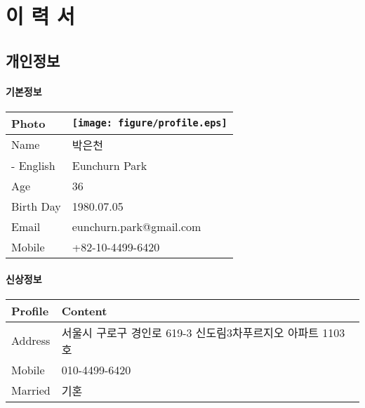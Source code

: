 \documentclass[]{article}
\date{}
\let\oldparagraph\paragraph
\renewcommand{\paragraph}[1]{\oldparagraph{#1}\mbox{}}
\begin{document}
\section{이 력 서}

{
\setcounter{tocdepth}{3}
\tableofcontents
}

\clearpage
\subsection{개인정보}

\paragraph{기본정보}

\begin{tabularx}{\textwidth}{@{}XX@{}}
\toprule
Photo & \texttt{[image: figure/profile.eps]}\\
\midrule
Name & 박은천\\
- English & Eunchurn Park\\
Age & 36\tabularnewline
Birth Day & 1980.07.05\\
Email & eunchurn.park@gmail.com\\
Mobile & +82-10-4499-6420\\
\bottomrule
\end{tabularx}


\paragraph{신상정보}

\begin{tabularx}{\textwidth}{@{}XX@{}}
\toprule
Profile & Content\\
\midrule
Address & 서울시 구로구 경인로 619-3 신도림3차푸르지오 아파트
1103호\\
Mobile & 010-4499-6420\\
Married & 기혼\\
\bottomrule
\end{tabularx}
\end{document}
